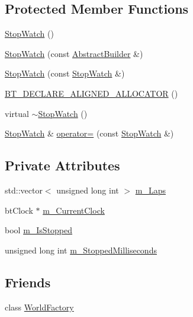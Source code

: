 \subsection*{Protected Member Functions}
\begin{DoxyCompactItemize}
\item 
\mbox{\hyperlink{classnjli_1_1_stop_watch_ac094097f357ce5be29c99163839b69e3}{Stop\+Watch}} ()
\item 
\mbox{\hyperlink{classnjli_1_1_stop_watch_aebfc9a72bddb3b3be0e32ede9aad6c81}{Stop\+Watch}} (const \mbox{\hyperlink{classnjli_1_1_abstract_builder}{Abstract\+Builder}} \&)
\item 
\mbox{\hyperlink{classnjli_1_1_stop_watch_a9417fb532a505e9bffc6833cab50c4fc}{Stop\+Watch}} (const \mbox{\hyperlink{classnjli_1_1_stop_watch}{Stop\+Watch}} \&)
\item 
\mbox{\hyperlink{classnjli_1_1_stop_watch_acbfde61e615ca5f35cfb60307576015f}{B\+T\+\_\+\+D\+E\+C\+L\+A\+R\+E\+\_\+\+A\+L\+I\+G\+N\+E\+D\+\_\+\+A\+L\+L\+O\+C\+A\+T\+OR}} ()
\item 
virtual \mbox{\hyperlink{classnjli_1_1_stop_watch_a255e775e661935059ed46c68a8109d40}{$\sim$\+Stop\+Watch}} ()
\item 
\mbox{\hyperlink{classnjli_1_1_stop_watch}{Stop\+Watch}} \& \mbox{\hyperlink{classnjli_1_1_stop_watch_a5cb9c0f427eff50c366fc724bd5c36d6}{operator=}} (const \mbox{\hyperlink{classnjli_1_1_stop_watch}{Stop\+Watch}} \&)
\end{DoxyCompactItemize}
\subsection*{Private Attributes}
\begin{DoxyCompactItemize}
\item 
std\+::vector$<$ unsigned long int $>$ \mbox{\hyperlink{classnjli_1_1_stop_watch_a8a743a402f3b3196e5d1821c15a7a567}{m\+\_\+\+Laps}}
\item 
bt\+Clock $\ast$ \mbox{\hyperlink{classnjli_1_1_stop_watch_abf7f6282ed8ff446622b56da25d5dbfd}{m\+\_\+\+Current\+Clock}}
\item 
bool \mbox{\hyperlink{classnjli_1_1_stop_watch_a4e9ad8912f5c1d4246a5cda677f6d585}{m\+\_\+\+Is\+Stopped}}
\item 
unsigned long int \mbox{\hyperlink{classnjli_1_1_stop_watch_a90f72afdaba0072fc81c3d11953e0a1c}{m\+\_\+\+Stopped\+Milliseconds}}
\end{DoxyCompactItemize}
\subsection*{Friends}
\begin{DoxyCompactItemize}
\item 
class \mbox{\hyperlink{classnjli_1_1_stop_watch_acb96ebb09abe8f2a37a915a842babfac}{World\+Factory}}
\end{DoxyCompactItemize}



